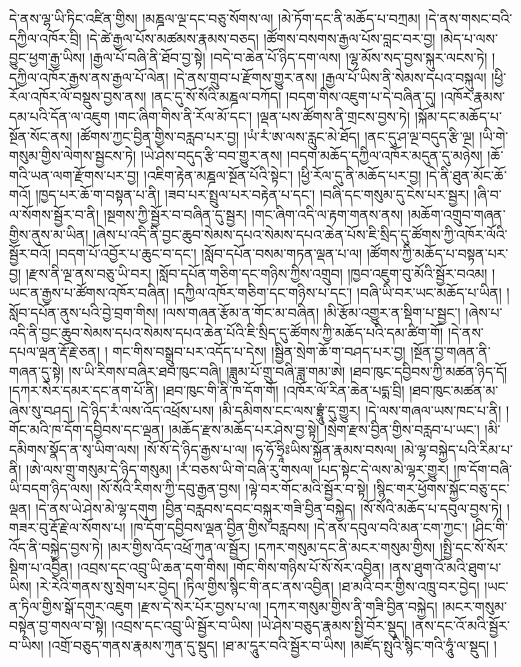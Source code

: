 དེ་ནས་ལྷ་ཡི་ཏིང་འཛིན་གྱིས། །མཎྜལ་ལྔ་དང་བཅུ་སོགས་ལ། །མེ་ཏོག་དང་ནི་མཆོད་པ་བཀྲམ། །དེ་ནས་གསང་བའི་དཀྱིལ་འཁོར་བྲི། །དེ་ཚེ་རྒྱལ་པོས་མཚམས་རྣམས་བཅད། །ཚོགས་བསགས་རྒྱལ་པོས་བླང་བར་བྱ། །མེད་པ་ལས་བྱུང་ཕྱག་རྒྱ་ཡིས། །རྒྱལ་པོ་བཞི་ནི་ཐོབ་བྱ་སྟེ། །བདེ་བ་ཆེན་པོ་ཉིད་དག་ལས། །ལྷ་མོས་སད་བྱས་སྐུར་ལངས་ཏེ། །དཀྱིལ་འཁོར་རྒྱས་ནས་རྒྱལ་པོ་ལེན། །དེ་ནས་གྲུབ་པ་རྫོགས་གྱུར་ནས། །རྒྱལ་པོ་ཡིས་ནི་སེམས་དཔའ་བསྐུལ། །ཕྱི་རོལ་འཁོར་ལོ་བསྡུས་བྱས་ནས། །ནང་དུ་སོ་སོའི་མཎྜལ་བཀོད། །བདག་གིས་འཇུག་པ་དེ་བཞིན་དུ། །འཁོར་རྣམས་དམ་པའི་དོན་ལ་འཇུག །གང་ཞིག་གིས་ནི་རོལ་མོ་དང་། །ལྡན་པས་ཚོགས་ནི་གྲངས་བྱས་ཏེ། །སྐོམ་དང་མཆོད་པ་སྔོན་སོང་ནས། །ཚོགས་ཀྱང་བྱིན་གྱིས་བརླབ་པར་བྱ། །ཡཾ་རཾ་ཨ་ལས་རླུང་མེ་ཐོད། །ནང་དུ་ཤ་ལྔ་བདུད་རྩི་ལྔ། །ཡི་གེ་གསུམ་གྱིས་ལེགས་སྦྱངས་ཏེ། །ཡེ་ཤེས་བདུད་རྩི་བབ་གྱུར་ནས། །བདག་མཆོད་དཀྱིལ་འཁོར་མདུན་དུ་མཉེས། །ཆོ་གའི་ཡན་ལག་རྫོགས་པར་བྱ། །འཇིག་རྟེན་མཎྜལ་སྔོན་པོའི་སྟེང་། །ཕྱི་རོལ་དུ་ནི་མཆོད་པར་བྱ། །དེ་ནི་ཐུན་མོང་ཆོ་གའོ། །ཁྱད་པར་ཆོ་ག་བསྟན་པ་ནི། །ཟབ་པར་སྤྲུལ་པར་བརྟེན་པ་དང་། །བཞི་དང་གསུམ་དུ་ངེས་པར་སྦྱར། །ཞི་བ་ལ་སོགས་སྦྱོར་བ་ནི། །སྔགས་ཀྱི་སྦྱོར་བ་བཞིན་དུ་སྦྱར། །གང་ཞིག་འདི་ལ་རྟག་གནས་ནས། །མཆོག་འགྲུབ་གཞན་གྱིས་ནུས་མ་ཡིན། །ཞེས་པ་འདི་ནི་བྱང་ཆུབ་སེམས་དཔའ་སེམས་དཔའ་ཆེན་པོས་ཇི་སྲིད་དུ་ཚོགས་ཀྱི་འཁོར་ལོའི་སྦྱོར་བའོ། །བདག་པོ་འབྱོར་པ་ཆུང་བ་དང་། །སློབ་དཔོན་བསམ་གཏན་ལྡན་པ་ལ། །ཚོགས་ཀྱི་མཆོད་པ་བསྟན་པར་བྱ། །རྫས་ནི་ལྔ་ནས་བཅུ་ཡི་བར། །སློབ་དཔོན་གཅིག་དང་གཉིས་ཀྱིས་འགྲུབ། །ཁྱབ་འཇུག་བུ་མོའི་སྦྱོར་བའམ། །ཡང་ན་རྒྱས་པ་ཚོགས་འཁོར་བཞིན། །དཀྱིལ་འཁོར་གཅིག་དང་གཉིས་པ་དང་། །བཞི་ཡི་བར་ཡང་མཆོད་པ་ཡིན། །སློབ་དཔོན་ནུས་པའི་བྱེ་བྲག་གིས། །ལས་གཞན་རྩོམ་ན་གོང་མ་བཞིན། །མི་རྩོམ་འགྱུར་ན་སྡིག་པ་སྦྱང་། །ཞེས་པ་འདི་ནི་བྱང་ཆུབ་སེམས་དཔའ་སེམས་དཔའ་ཆེན་པོའི་ཇི་སྲིད་དུ་ཚོགས་ཀྱི་མཆོད་པའི་དམ་ཚིག་གོ། །དེ་ནས་དཔལ་ལྡན་རྡོ་རྗེ་ཅན། །
གང་གིས་བསྒྲུབ་པར་འདོད་པ་དེས། །སྦྱིན་སྲེག་ཆོ་ག་བཤད་པར་བྱ། །སྔོན་བྱ་གཞན་ནི་གཞན་དུ་སྟེ། །ས་ཡི་རིགས་བཞིར་ཐབ་ཁུང་བཞི། །ཟླུམ་པོ་གྲུ་བཞི་ཟླ་གམ་ཨེ། །ཐབ་ཁུང་དབྱིབས་ཀྱི་མཚན་ཉིད་དོ། །དཀར་སེར་དམར་དང་ནག་པོ་ནི། །ཐབ་ཁུང་གི་ནི་ཁ་དོག་གོ། །འཁོར་ལོ་རིན་ཆེན་པདྨ་བྲི། །ཐབ་ཁུང་མཚན་མ་ཞེས་སུ་བཤད། །དེ་ཉིད་རཾ་ལས་འོད་འཕྲོས་པས། །མི་དམིགས་ངང་ལས་བྷྲཱུཾ་དུ་གྱུར། །དེ་ལས་གཞལ་ཡས་ཁང་པ་ནི། །གོང་མའི་ཁ་དོག་དབྱིབས་དང་ལྡན། །མཆོད་རྫས་མཆོད་པར་ཤེས་བྱ་སྟེ། །སྲེག་རྫས་བྱིན་གྱིས་བརླབ་པ་ཡང་། །མི་དམིགས་སྣོད་ན་སྭ་ཡིག་ལས། །སོ་སོ་དེ་ཉིད་རྒྱས་པ་ལ། །ཧ་ཧོ་ཧྲཱིཿཡིས་སྐྱོན་རྣམས་བསལ། །མེ་ལྷ་བསྐྱེད་པའི་རིམ་པ་ནི། །ཨེ་ལས་གྲུ་གསུམ་དེ་ཉིད་གསུམ། །རཾ་བཅས་ཡི་གེ་བཞི་རུ་གསལ། །པད་སྟེང་དེ་ལས་མེ་ལྷར་གྱུར། །ཁ་དོག་བཞི་ཡི་བདག་ཉིད་ལས། །སོ་སོའི་རིགས་ཀྱི་དབུ་རྒྱན་བྱས། །ལྟེ་བར་གོང་མའི་སྦྱོར་བ་སྟེ། །སྙིང་གར་ཕྱོགས་སྐྱོང་བཅུ་དང་ལྡན། །དེ་ནས་ཡེ་ཤེས་མེ་ལྷ་དགུག །བྱིན་བརླབས་དབང་བསྐུར་གཟི་བྱིན་བསྐྱེད། །སོ་སོའི་མཆོད་པ་དབུལ་བྱས་ཏེ། །གཟར་བུ་རྡོ་རྗེ་ལ་སོགས་པ། །ཁ་དོག་དབྱིབས་ལྡན་བྱིན་གྱིས་བརླབས། །དེ་ནས་དབུལ་བའི་མན་ངག་ཀྱང་། །ཤིང་གི་འོད་ནི་བསྐྱེད་བྱས་ཏེ། །མར་གྱིས་འོད་འཕྲོ་ཀུན་ལ་སྦྱོར། །དཀར་གསུམ་དང་ནི་མངར་གསུམ་གྱིས། །སྤྱི་དང་སོ་སོར་སྡིག་པ་འབྱིན། །འབྲས་དང་འབྲུ་ཡི་ཆན་དག་གིས། །གོང་གིས་གཉིས་པོ་སོ་སོར་འབྱིན། །ནས་ཐུག་འོ་མའི་ཐུག་པ་ཡིས། །རེ་རེའི་གནས་སུ་སྲེག་པར་བྱེད། །ཏིལ་གྱིས་སྙིང་གི་ནང་ནས་འབྱིན། །ཐ་མའི་བར་གྱིས་འཁྲུ་བར་བྱེད། །ཡང་ན་ཏིལ་གྱིས་སྒོ་དགུར་འཇུག །རྫས་དེ་སེར་པོར་བྱས་པ་ལ། །དཀར་གསུམ་གྱིས་ནི་གཟི་བྱིན་བསྐྱེད། །མངར་གསུམ་བསྟེན་བྱ་གསལ་བ་སྟེ། །འབྲས་དང་འབྲུ་ཡི་སྦྱོར་བ་ཡིས། །ཡེ་ཤེས་བཅུད་རྣམས་སྤྱི་བོར་སྡུད། །ནས་དང་འོ་མའི་སྦྱོར་བ་ཡིས། །འགྲོ་བཅུད་གནས་རྣམས་ཀུན་དུ་སྡུད། །ཐ་མ་དཱུར་བའི་སྦྱོར་བ་ཡིས། །མཛོད་སྤུའི་སྙིང་གའི་ཧཱུཾ་ལ་སྡུད། །
